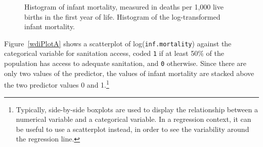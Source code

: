 \begin{figure}[h]
	\centering
	\caption{ Histogram of infant mortality, measured in deaths per 1,000 live births in the first year of life.  Histogram of the log-transformed infant \mbox{mortality}.}
	\label{wdiHistTransform}
\end{figure}

\textD{\newpage}

Figure~\ref{wdiPlotA} shows a scatterplot of log(\texttt{inf.mortality}) against the categorical variable for sanitation access, coded \texttt{1} if at least 50\% of the population has access to adequate sanitation, and \texttt{0} otherwise. Since there are only two values of the predictor, the values of infant mortality are stacked above the two predictor values 0 and 1.\footnote{Typically, side-by-side boxplots are used to display the relationship between a numerical variable and a categorical variable. In a regression context, it can be useful to use a scatterplot instead, in order to see the variability around the regression line.} 

